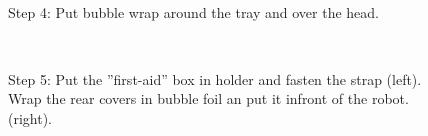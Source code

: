 \begin{figure}[!ht]
\centering
\mbox{\quad
{}}
\caption{Step 4: Put bubble wrap around the tray and over the head.} %
\end{figure}

\begin{figure}[!ht]
\centering
\mbox{\quad
{}}
\caption{Step 5: Put the ''first-aid'' box in holder and fasten the strap (left). Wrap the rear covers in bubble foil an put it infront of the robot. (right).} %
\end{figure}

